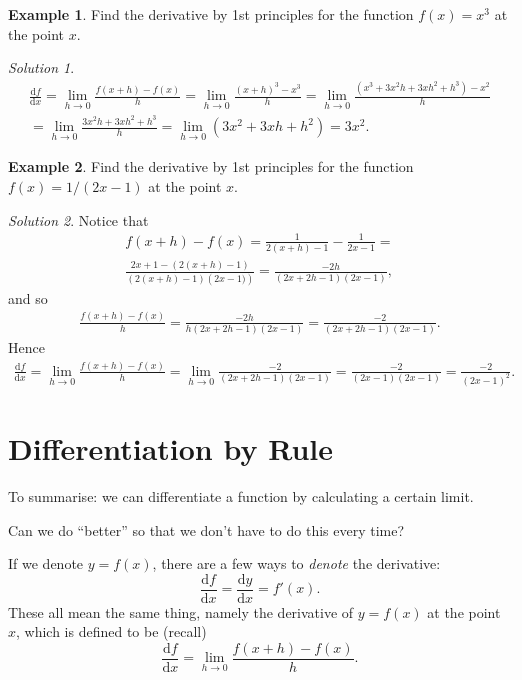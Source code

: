 \documentclass[
  11pt,
  oneside]{book}
\newcommand{\slide}{}
\theoremstyle{definition}
\theoremstyle{definition}
\newtheorem{example}{Example}[chapter]
\theoremstyle{definition}
\theoremstyle{definition}
\theoremstyle{remark}
\newtheorem*{solution}{Solution}
\begin{document}
\begin{example}
Find the derivative by 1st principles for the function \(f(x) = x^3\) at the point \(x\).
\end{example}

\begin{solution}
\begin{gather*}
\frac{\mathrm{d} f}{\mathrm{d} x} = \lim\limits_{h\to0}\frac{f(x+h)-f(x)}{h} = \lim\limits_{h\to0}\frac{(x+h)^3 - x^3}{h} = \lim\limits_{h\to0}\frac{(x^3+3x^2h+3xh^2+h^3)-x^2}{h}\\ = \lim\limits_{h\to0}\frac{3x^2h+3xh^2+h^3}{h} = \lim\limits_{h\to0}(3x^2+3xh+h^2) = 3x^2.
\end{gather*}
\end{solution}

\slide

\begin{example}
Find the derivative by 1st principles for the function \(f(x) = 1/(2x-1)\) at the point \(x\).
\end{example}

\begin{solution}
Notice that
\begin{gather*}
f(x+h)-f(x) = \frac{1}{2(x+h)-1} - \frac{1}{2x-1} =\\ \frac{2x+1-\left(2(x+h)-1\right)}{\left(2(x+h)-1\right)\left(2x-1)\right)} = \frac{-2h}{(2x+2h-1)(2x-1)},
\end{gather*}
and so
\begin{gather*}
\frac{f(x+h)-f(x)}{h} = \frac{-2h}{h(2x+2h-1)(2x-1)} = \frac{-2}{(2x+2h-1)(2x-1)}.
\end{gather*}
Hence
\begin{gather*}
\frac{\mathrm{d} f}{\mathrm{d} x} = \lim\limits_{h\to0}\frac{f(x+h)-f(x)}{h} = \lim\limits_{h\to0}\frac{-2}{(2x+2h-1)(2x-1)} = \frac{-2}{(2x-1)(2x-1)} = \frac{-2}{(2x-1)^2}.
\end{gather*}
\end{solution}

\section{Differentiation by Rule}\label{lecture-three}

To summarise: we can differentiate a function by calculating a certain limit.

Can we do ``better'' so that we don't have to do this every time?

If we denote \(y = f(x)\), there are a few ways to \emph{denote} the derivative:
\[
\frac{\mathrm{d} f}{\mathrm{d} x} = \frac{\mathrm{d} y}{\mathrm{d} x} = f'(x).
\]
These all mean the same thing, namely the derivative of \(y=f(x)\) at the point \(x\), which is defined to be (recall)
\[
\frac{\mathrm{d} f}{\mathrm{d} x} = \lim\limits_{h\to0}\frac{f(x+h)-f(x)}{h}.
\]
\end{document}

